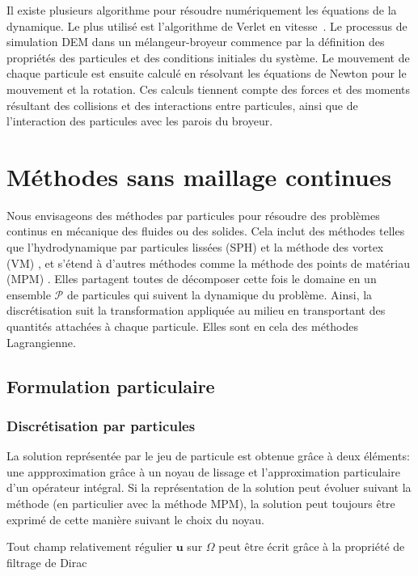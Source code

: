 Il existe plusieurs algorithme pour résoudre numériquement les équations de la dynamique. Le plus utilisé est l'algorithme de Verlet en vitesse~\cite{verlet_1982}.
Le processus de simulation DEM dans un mélangeur-broyeur commence par la définition des propriétés des particules et des conditions initiales du système. Le mouvement de chaque particule est ensuite calculé en résolvant les équations de Newton pour le mouvement et la rotation. Ces calculs tiennent compte des forces et des moments résultant des collisions et des interactions entre particules, ainsi que de l'interaction des particules avec les parois du broyeur.

\section{Méthodes sans maillage continues}\label{sec:part_cont}
Nous envisageons des méthodes par particules pour résoudre des problèmes continus en mécanique des fluides ou des solides. Cela inclut des méthodes telles que l'hydrodynamique par particules lissées (SPH) \cite{lucy_1977,gingold_monaghan_sph_1977} et la méthode des vortex (VM) \cite{cottet_vortex_2000}, et s'étend à d'autres méthodes comme la méthode des points de matériau (MPM) \cite{sulsky_particle_1994}. Elles partagent toutes de décomposer cette fois le domaine en un ensemble $\mathcal{P}$ de particules qui suivent la dynamique du problème. Ainsi, la discrétisation suit la transformation appliquée au milieu en transportant des quantités attachées à chaque particule. Elles sont en cela des méthodes Lagrangienne.

\subsection{Formulation particulaire}

\subsubsection{Discrétisation par particules}

La solution représentée par le jeu de particule est obtenue grâce à deux éléments: une appproximation grâce à un noyau de lissage et l'approximation particulaire d'un opérateur intégral. Si la représentation de la solution peut évoluer suivant la méthode (en particulier avec la méthode MPM), la solution peut toujours être exprimé de cette manière suivant le choix du noyau.

Tout champ relativement régulier $\bm{u}$ sur $\Omega$ peut être écrit grâce à la propriété de filtrage de Dirac

